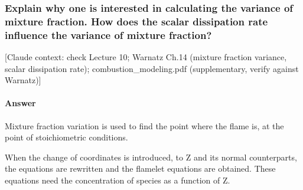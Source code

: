 \subsubsection{Explain why one is interested in calculating the variance of mixture fraction. How does the scalar dissipation rate influence the variance of mixture fraction?}

{\color{gray}\footnotesize [Claude context: check Lecture 10; Warnatz Ch.14 (mixture fraction variance, scalar dissipation rate); combustion\_modeling.pdf (supplementary, verify against Warnatz)]}

\label{Q:Variance of mixure fraction}

\paragraph{Answer}

Mixture fraction variation is used to find the point where the flame is, at the point of stoichiometric conditions.

When the change of coordinates is introduced, to Z and its normal counterparts, the equations are rewritten and the flamelet equations are obtained. These equations need the concentration of species as a function of Z.

